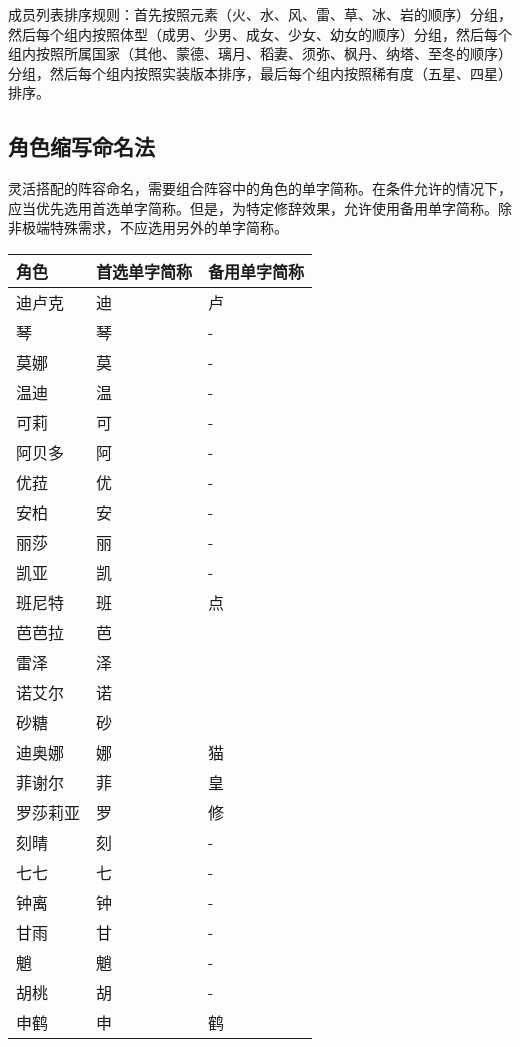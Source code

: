 成员列表排序规则：首先按照元素（火、水、风、雷、草、冰、岩的顺序）分组，然后每个组内按照体型（成男、少男、成女、少女、幼女的顺序）分组，然后每个组内按照所属国家（其他、蒙德、璃月、稻妻、须弥、枫丹、纳塔、至冬的顺序）分组，然后每个组内按照实装版本排序，最后每个组内按照稀有度（五星、四星）排序。


\subsection{角色缩写命名法}

灵活搭配的阵容命名，需要组合阵容中的角色的单字简称。在条件允许的情况下，应当优先选用首选单字简称。但是，为特定修辞效果，允许使用备用单字简称。除非极端特殊需求，不应选用另外的单字简称。

\begin{longtabu}{|X[2c]|X[c]|X[c]|}
	\hline
	{角色} & {首选单字简称} & {备用单字简称} \\
	\hline
	\endhead
	\hline
	\endfoot
	{迪卢克} & {迪} & {卢} \\
	{琴} & {琴} & {-} \\
	{莫娜} & {莫} & {-} \\
	{温迪} & {温} & {-} \\
	{可莉} & {可} & {-} \\
	{阿贝多} & {阿} & {-} \\
	{优菈} & {优} & {-} \\
	\hline
	{安柏} & {安} & {-} \\
	{丽莎} & {丽} & {-} \\
	{凯亚} & {凯} & {-} \\
	{班尼特} & {班} & {点} \\
	{芭芭拉} & {芭} & {} \\
	{雷泽} & {泽} & {} \\
	{诺艾尔} & {诺} & {} \\
	{砂糖} & {砂} & {} \\
	{迪奥娜} & {娜} & {猫} \\
	{菲谢尔} & {菲} & {皇} \\
	{罗莎莉亚} & {罗} & {修} \\
	\hline
	{刻晴} & {刻} & {-} \\
	{七七} & {七} & {-} \\
	{钟离} & {钟} & {-} \\
	{甘雨} & {甘} & {-} \\
	{魈} & {魈} & {-} \\
	{胡桃} & {胡} & {-} \\
	{申鹤} & {申} & {鹤} \\

\end{longtabu}
